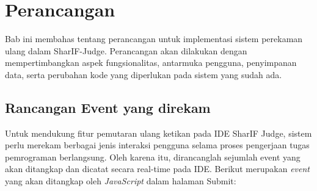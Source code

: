 \chapter{Perancangan}
\label{chap:perancangan}

Bab ini membahas tentang perancangan untuk implementasi sistem perekaman ulang dalam SharIF-Judge. Perancangan akan dilakukan dengan mempertimbangkan aspek fungsionalitas, antarmuka pengguna, penyimpanan data, serta perubahan kode yang diperlukan pada sistem yang sudah ada.

\section{Rancangan Event yang direkam}

Untuk mendukung fitur pemutaran ulang ketikan pada IDE SharIF Judge, sistem perlu merekam berbagai jenis interaksi pengguna selama proses pengerjaan tugas pemrograman berlangsung. Oleh karena itu, dirancanglah sejumlah event yang akan ditangkap dan dicatat secara real-time pada IDE. Berikut merupakan \textit{event} yang akan ditangkap oleh \textit{JavaScript} dalam halaman Submit:

